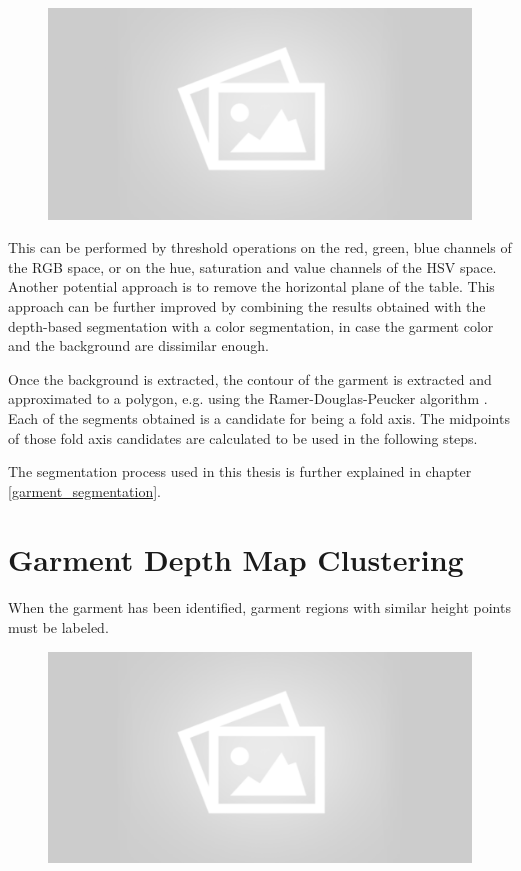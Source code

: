 \begin{figure}[thpb]
    \centering
    \includegraphics[width=0.8
    \textwidth]{figures/placeholder2.png}
    \caption{}
    \label{fig:generic_garment_segmentation}
\end{figure}

This can be performed by threshold operations on the red, green, blue channels of the RGB space, or on the hue, saturation and value channels of the HSV space. Another potential approach is to remove the horizontal plane of the table. This approach can be further improved by combining the results obtained with the depth-based segmentation with a color segmentation, in case the garment color and the background are dissimilar enough.

Once the background is extracted, the contour of the garment is extracted and approximated to a polygon, e.g. using the Ramer-Douglas-Peucker algorithm . Each of the segments obtained is a candidate for being a fold axis. The midpoints of those fold axis candidates are calculated to be used in the following steps.

The segmentation process used in this thesis is further explained in chapter \ref{garment_segmentation}.

\section{Garment Depth Map Clustering}
When the garment has been identified, garment regions with similar height points must be labeled. 

\begin{figure}[thpb]
    \centering
    \includegraphics[width=0.8
    \textwidth]{figures/placeholder2.png}
    \caption{}
    \label{fig:generic_superpixels}
\end{figure}

